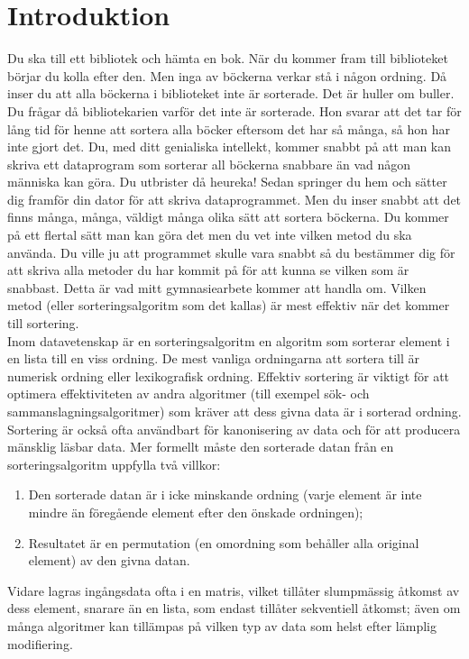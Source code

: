 \documentclass[a4, oneside]{report}
\begin{document}
\section{Introduktion}
Du ska till ett bibliotek och hämta en bok. När du kommer fram till biblioteket börjar du kolla efter den. Men inga av böckerna verkar stå i någon ordning. Då inser du att alla böckerna i biblioteket inte är sorterade. Det är huller om buller. Du frågar då bibliotekarien varför det inte är sorterade. Hon svarar att det tar för lång tid för henne att sortera alla böcker eftersom det har så många, så hon har inte gjort det. Du, med ditt genialiska intellekt, kommer snabbt på att man kan skriva ett dataprogram som sorterar all böckerna snabbare än vad någon människa kan göra. Du utbrister då heureka! Sedan springer du hem och sätter dig framför din dator för att skriva dataprogrammet. Men du inser snabbt att det finns många, många, väldigt många olika sätt att sortera böckerna. Du kommer på ett flertal sätt man kan göra det men du vet inte vilken metod du ska använda. Du ville ju att programmet skulle vara snabbt så du bestämmer dig för att skriva alla metoder du har kommit på för att kunna se vilken som är snabbast. Detta är vad mitt gymnasiearbete kommer att handla om. Vilken metod (eller sorteringsalgoritm som det kallas) är mest effektiv när det kommer till sortering.\\
Inom datavetenskap är en sorteringsalgoritm en algoritm som sorterar element i en lista till en viss ordning. De mest vanliga ordningarna att sortera till är numerisk ordning eller lexikografisk ordning. Effektiv sortering är viktigt för att optimera effektiviteten av andra algoritmer (till exempel sök- och sammanslagningsalgoritmer) som kräver att dess givna data är i sorterad ordning. Sortering är också ofta användbart för kanonisering av data och för att producera mänsklig läsbar data. Mer formellt måste den sorterade datan från en sorteringsalgoritm uppfylla två villkor:\cite{1, 2}
\begin{enumerate}
    \item Den sorterade datan är i icke minskande ordning (varje element är inte mindre än föregående element efter den önskade ordningen);
    \item Resultatet är en permutation (en omordning som behåller alla original element) av den givna datan.
\end{enumerate}
Vidare lagras ingångsdata ofta i en matris, vilket tillåter slumpmässig åtkomst av dess element, snarare än en lista, som endast tillåter sekventiell åtkomst; även om många algoritmer kan tillämpas på vilken typ av data som helst efter lämplig modifiering.\\
\end{document}
